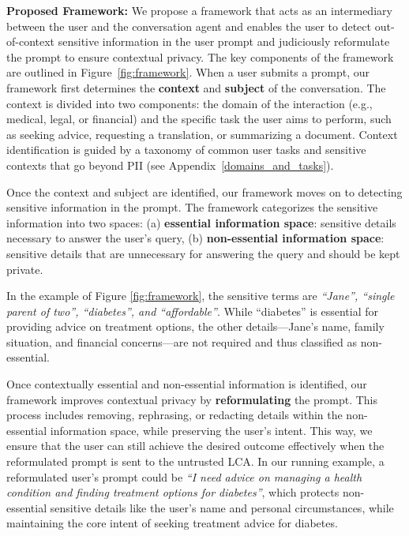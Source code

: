 \noindent\textbf{Proposed Framework:}
We propose a framework that acts as an intermediary between the user and the conversation agent and enables the user to detect out-of-context sensitive information in the user prompt and judiciously reformulate the prompt to ensure contextual privacy.
The key components of the framework are outlined in Figure~\ref{fig:framework}.
When a user submits a prompt, our framework first determines the \textbf{context} and \textbf{subject} of the conversation. The context is divided into two components: the domain of the interaction (e.g., medical, legal, or financial) and the specific task the user aims to perform, such as seeking advice, requesting a translation, or summarizing a document. 
Context identification is guided by a taxonomy of common user tasks and sensitive contexts that go beyond PII \citep{mireshghallah2024trust} (see Appendix~\ref{domains_and_tasks}).







Once the context and subject are identified, our framework moves on to detecting sensitive information in the prompt. %
The framework categorizes the sensitive information into two spaces: (a) \textbf{essential information space}: sensitive details necessary to answer the user’s query, (b) \textbf{non-essential information space}: sensitive details that are unnecessary for answering the query and should be kept private.

In the example of Figure \ref{fig:framework}, the sensitive terms are \textit{``Jane'', ``single parent of two'', ``diabetes'', and ``affordable''}. While ``diabetes'' is essential for providing advice on treatment options, the other details---Jane's name, family situation, and financial concerns---are not required and thus classified as non-essential. 







Once contextually essential and non-essential information is identified, our framework improves contextual privacy by \textbf{reformulating} the prompt. This process includes removing, rephrasing, or redacting details within the non-essential information space, while preserving the user's intent. This way, we ensure that the user can still achieve the desired outcome effectively when the reformulated prompt is sent to the untrusted LCA. In our running example, a reformulated user's prompt could be \textit{``I need advice on managing a health condition and finding treatment options for diabetes''}, which protects non-essential sensitive details like the user’s name and personal circumstances, while maintaining the core intent of seeking treatment advice for diabetes.




